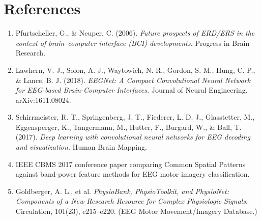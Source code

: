 \documentclass[11pt,a4paper]{article}
\begin{document}
\section*{References}
\begin{enumerate}[leftmargin=1.5em]
    \item \label{pfurtscheller2006} Pfurtscheller, G., \& Neuper, C. (2006). \textit{Future prospects of ERD/ERS in the context of brain--computer interface (BCI) developments.} Progress in Brain Research.
    \item \label{lawhern2018} Lawhern, V. J., Solon, A. J., Waytowich, N. R., Gordon, S. M., Hung, C. P., \& Lance, B. J. (2018). \textit{EEGNet: A Compact Convolutional Neural Network for EEG-based Brain-Computer Interfaces.} Journal of Neural Engineering. arXiv:1611.08024.
    \item \label{schirrmeister2017} Schirrmeister, R. T., Springenberg, J. T., Fiederer, L. D. J., Glasstetter, M., Eggensperger, K., Tangermann, M., Hutter, F., Burgard, W., \& Ball, T. (2017). \textit{Deep learning with convolutional neural networks for EEG decoding and visualization.} Human Brain Mapping.
    \item \label{cbms2017} IEEE CBMS 2017 conference paper comparing Common Spatial Patterns against band-power feature methods for EEG motor imagery classification.
    \item Goldberger, A. L., et al. \textit{PhysioBank, PhysioToolkit, and PhysioNet: Components of a New Research Resource for Complex Physiologic Signals.} Circulation, 101(23), e215--e220. (EEG Motor Movement/Imagery Database.)
\end{enumerate}
\end{document}
